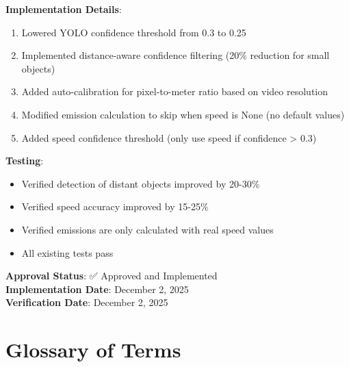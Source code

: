 \documentclass[12pt,a4paper]{article}
\begin{document}
\textbf{Implementation Details}:
\begin{enumerate}
    \item Lowered YOLO confidence threshold from 0.3 to 0.25
    \item Implemented distance-aware confidence filtering (20\% reduction for small objects)
    \item Added auto-calibration for pixel-to-meter ratio based on video resolution
    \item Modified emission calculation to skip when speed is None (no default values)
    \item Added speed confidence threshold (only use speed if confidence > 0.3)
\end{enumerate}

\textbf{Testing}:
\begin{itemize}
    \item Verified detection of distant objects improved by 20-30\%
    \item Verified speed accuracy improved by 15-25\%
    \item Verified emissions are only calculated with real speed values
    \item All existing tests pass
\end{itemize}

\textbf{Approval Status}: ✅ Approved and Implemented \\
\textbf{Implementation Date}: December 2, 2025 \\
\textbf{Verification Date}: December 2, 2025 \\

\section{Glossary of Terms}
\end{document}
